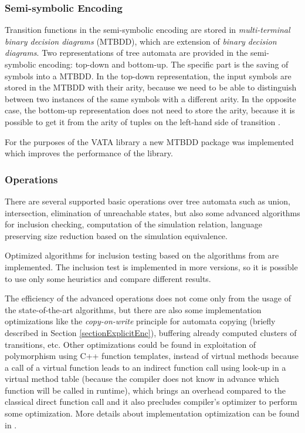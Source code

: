 \subsubsection{Semi-symbolic Encoding}
Transition functions in the semi-symbolic encoding are stored in \emph{multi-terminal binary decision diagrams} (MTBDD), 
which are extension of \emph{binary decision 
diagrams}. Two representations of tree automata are provided in the semi-symbolic encoding: top-down and bottom-up. 
The specific part is the saving of symbols into a MTBDD. In the top-down representation, the input
symbols are stored in the MTBDD with their arity, because we need to be able to distinguish between two instances of the same symbols with a different arity.
In the opposite case, the bottom-up representation does not need to store the arity, because it is possible to get it from the arity of tuples 
on the left-hand side of transition \cite{libvata}.

For the purposes of the VATA library a new MTBDD package was implemented which improves the performance of the library.

\subsubsection{Operations}
There are several supported basic operations over tree automata 
such as union, intersection, elimination of unreachable states, but also some advanced algorithms for inclusion checking, 
computation of the simulation relation, language preserving size reduction based on the simulation equivalence. 

Optimized algorithms for inclusion testing based on the algorithms from \cite{cav06,tacas10} are implemented. 
The inclusion test is implemented in more versions, so it is possible
to use only some heuristics and compare different results.

The efficiency of the advanced operations does not come only from the usage of the state-of-the-art algorithms, 
but there are also some implementation optimizations like the \emph{copy-on-write}
principle for automata copying (briefly described in Section \ref{sectionExplicitEnc}), buffering already computed clusters of transitions, etc. 
Other optimizations could be found in exploitation of polymorphism using C++ function templates, instead of
virtual methods because a call of a virtual function leads to an indirect function call using look-up in a virtual method table 
(because the compiler does not know in advance which function will be called in runtime), which brings an overhead compared to the classical direct 
function call and it also precludes compiler's optimizer to perform some optimization. 
More details about implementation optimization can be found in \cite{libvata}.

